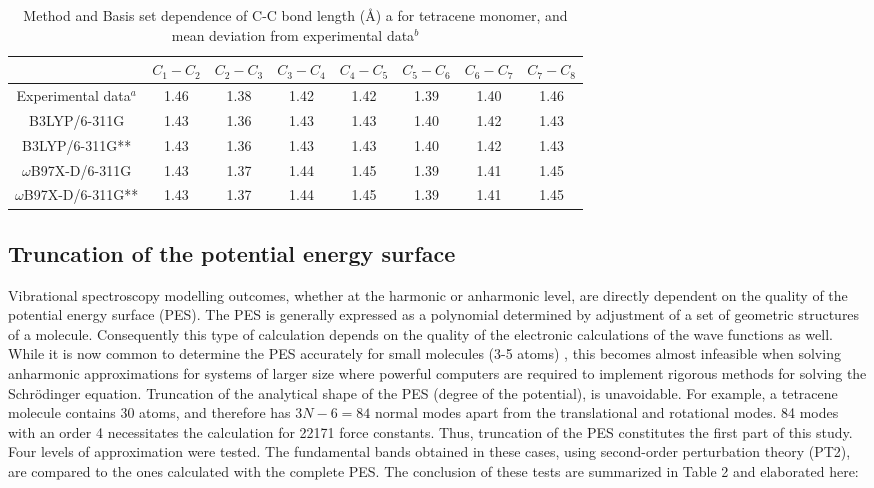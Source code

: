 \begin{table}[h]
	\begin{tabular}{c c c c c c c c }
	\toprule
	&$C_{1}-C_{2}$&$C_{2}-C_{3}$&$C_{3}-C_{4}$&$C_{4}-C_{5}$&$C_{5}-C_{6}$&$C_{6}-C_{7}$&$C_{7}-C_{8}$\\
	\midrule
	\multicolumn{1}{p{2.5cm}}{\centering Experimental data$^{a}$} & 1.46 & 1.38 &1.42 &1.42 &1.39& 1.40& 1.46\\
	B3LYP/6-311G& 1.43& 1.36&1.43&1.43&1.40&1.42&1.43 \\
	B3LYP/6-311G**&1.43&1.36&1.43&1.43&1.40&1.42&1.43\\
	$\omega$B97X-D/6-311G& 1.43&1.37&1.44&1.45&1.39&1.41&1.45\\
	$\omega$B97X-D/6-311G**&1.43&1.37&1.44&1.45&1.39&1.41&1.45\\
	\bottomrule
\end{tabular}
\caption{Method and Basis set dependence of C-C bond length (Å) a for tetracene monomer, and mean deviation from experimental data$^{b}$}
\end{table}

\subsection{Truncation of the potential energy surface}

Vibrational spectroscopy modelling outcomes, whether at the harmonic or anharmonic level, are directly dependent on the quality of the potential energy surface (PES). The PES is generally expressed as a polynomial determined by adjustment of a set of geometric structures of a molecule. Consequently this type of calculation depends on the quality of the electronic calculations of the wave functions as well. 
While it is now common to determine the PES accurately for small molecules (3-5 atoms) \cite{begue2007comparison}, this becomes almost infeasible when solving anharmonic approximations for systems of larger size where powerful computers are required to implement rigorous methods for solving the Schrödinger equation. Truncation of the analytical shape of the PES (degree of the potential), is unavoidable. For example, a tetracene molecule contains 30 atoms, and therefore has $3N - 6 = 84$ normal modes apart from the translational and rotational modes. 84 modes with an order 4 necessitates the calculation for 22171 force constants. Thus, truncation of the PES constitutes the first part of this study. Four levels of approximation were tested. The fundamental bands obtained in these cases, using second-order perturbation theory (PT2), are compared to the ones calculated with the complete PES. The conclusion of these tests are summarized in Table 2 and elaborated here:


